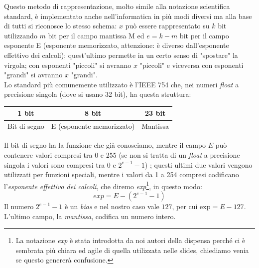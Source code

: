 \documentclass[class=book, crop=false, oneside]{standalone}
\begin{document}
Questo metodo di rappresentazione, molto simile alla notazione scientifica standard, è implementato anche nell'informatica in più modi diversi ma alla base di tutti si riconosce lo stesso schema: \(x\) può essere rappresentato su \(k\) bit utilizzando \(m\) bit per il campo mantissa M ed \(e=k-m\) bit per il campo esponente E (esponente memorizzato, attenzione: è diverso dall'esponente effettivo dei calcoli); quest'ultimo permette in un certo senso di "spostare" la virgola; con esponenti "piccoli" si avranno \(x\) "piccoli" e viceversa con esponenti "grandi" si avranno \(x\) "grandi".\\
Lo standard più comunemente utilizzato è l'IEEE 754 che, nei numeri \emph{float} a precisione singola (dove si usano 32 bit), ha questa struttura:
\begin{table}[h!]
	\centering
	\begin{tabular}{|l|l|l|}
		\hline
		\multicolumn{1}{|c|}{1 bit} & \multicolumn{1}{c|}{8 bit} & \multicolumn{1}{c|}{23 bit} \\ \hline
		Bit di segno                & E (esponente memorizzato)    & Mantissa                    \\ \hline
	\end{tabular}
\end{table}


Il bit di segno ha la funzione che già conosciamo, mentre il campo \(E\) può contenere valori compresi tra 0 e 255 (se non si tratta di un \emph{float} a precisione singola i valori sono compresi tra 0 e \(2^{e-1}-1\))%
; questi ultimi due valori vengono utilizzati per funzioni speciali, mentre i valori da 1 a 254 compresi codificano l'\emph{esponente effettivo dei calcoli}, che diremo \emph{exp}\footnote{La notazione \emph{exp} è stata introdotta da noi autori della dispensa perché ci è sembrata più chiara ed agile di quella utilizzata nelle slides, chiediamo venia se questo genererà confusione.}, in questo modo:
\begin{equation*}
	exp=E-(2^{e-1}-1)
\end{equation*}
Il numero \(2^{e-1}-1\) è un \emph{bias} e nel nostro caso vale \(127\), per cui \(\textrm{exp}=E-127\). L'ultimo campo, la \emph{mantissa}, codifica un numero intero.
\end{document}
